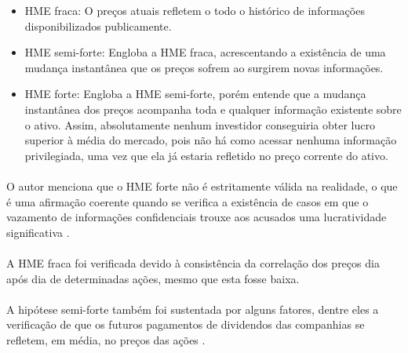 \begin{itemize}
    \item HME fraca: O preços atuais refletem o todo o histórico de informações disponibilizados publicamente.
    \item HME semi-forte: Engloba a HME fraca, acrescentando a existência de uma mudança instantânea que os preços sofrem ao surgirem novas informações.
    \item HME forte: Engloba a HME semi-forte, porém entende que a mudança instantânea dos preços acompanha toda e qualquer informação existente sobre o ativo. Assim, absolutamente nenhum investidor conseguiria obter lucro superior à média do mercado, pois não há como acessar nenhuma informação privilegiada, uma vez que ela já estaria refletido no preço corrente do ativo.
\end{itemize}

\paragraph{} O autor menciona que o HME forte não é estritamente válida na realidade, o que é uma afirmação coerente quando se verifica a existência de casos em que o vazamento de informações confidenciais trouxe aos acusados uma lucratividade significativa \cite{insider_trading}.

\paragraph{} A HME fraca foi verificada devido à consistência da correlação dos preços dia após dia de determinadas ações, mesmo que esta fosse baixa.

\paragraph{} A hipótese semi-forte também foi sustentada por alguns fatores, dentre eles a verificação de que os futuros pagamentos de dividendos das companhias se refletem, em média, no preços das ações \cite{fama1969adjustment}.

